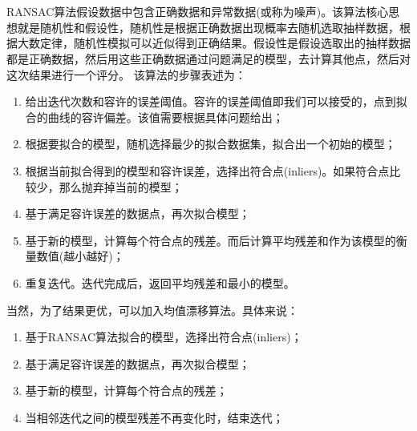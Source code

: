 \documentclass[12pt, twocolumn]{article}
\title{\normf{这是标题}}
\author{\normf{陈烁龙}}
\date{\normf{\today}}
\newcommand{\normf}{\kaishu}
\begin{document}
	
	\maketitle
	\thispagestyle{empty}
	\clearpage
	
	\tableofcontents
	\listoffigures
	\listoftables
	\setcounter{page}{1}
	\clearpage
	\setcounter{page}{1}
	
	\section{\normf{RANSCA}}
	\normf
	RANSAC算法假设数据中包含正确数据和异常数据(或称为噪声)。该算法核心思想就是随机性和假设性，随机性是根据正确数据出现概率去随机选取抽样数据，根据大数定律，随机性模拟可以近似得到正确结果。假设性是假设选取出的抽样数据都是正确数据，然后用这些正确数据通过问题满足的模型，去计算其他点，然后对这次结果进行一个评分。
	该算法的步骤表述为：
	\begin{enumerate}
		\item 给出迭代次数和容许的误差阈值。容许的误差阈值即我们可以接受的，点到拟合的曲线的容许偏差。该值需要根据具体问题给出；
		\item 根据要拟合的模型，随机选择最少的拟合数据集，拟合出一个初始的模型；
		\item 根据当前拟合得到的模型和容许误差，选择出符合点(inliers)。如果符合点比较少，那么抛弃掉当前的模型；
		\item 基于满足容许误差的数据点，再次拟合模型；
		\item 基于新的模型，计算每个符合点的残差。而后计算平均残差和作为该模型的衡量数值(越小越好)；
		\item 重复迭代。迭代完成后，返回平均残差和最小的模型。
	\end{enumerate}

当然，为了结果更优，可以加入均值漂移算法。具体来说：

	\begin{enumerate}
		\item 基于RANSAC算法拟合的模型，选择出符合点(inliers)；
		\item 基于满足容许误差的数据点，再次拟合模型；
		\item 基于新的模型，计算每个符合点的残差；
		\item 当相邻迭代之间的模型残差不再变化时，结束迭代；
	\end{enumerate}
\end{document}
